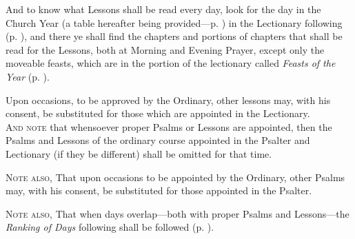     And to know what Lessons shall be read every day, look for the day in the Church Year (a table hereafter being provided---p. \pageref{TableOfSeasons}) in the Lectionary following (p. \pageref{LectionarySeason}), and there ye shall find the chapters and portions of chapters that shall be read for the Lessons, both at Morning and Evening Prayer, except only the moveable feasts, which are in the portion of the lectionary called \textit{Feasts of the Year} (p. \pageref{LectionarySaints}).

    Upon occasions, to be approved by the Ordinary, other lessons may, with his consent, be substituted for those which are appointed in the Lectionary.\\

    \textsc{And note} that whensoever proper Psalms or Lessons are appointed, then the Psalms and Lessons of the ordinary course appointed in the Psalter and Lectionary (if they be different) shall be omitted for that time.

    \textsc{Note also,} That upon occasions to be appointed by the Ordinary, other Psalms may, with his consent, be substituted for those appointed in the Psalter.

    \textsc{Note also,} That when days overlap---both with proper Psalms and Lessons---the \textit{Ranking of Days} following shall be followed (p. \pageref{ranking}).

